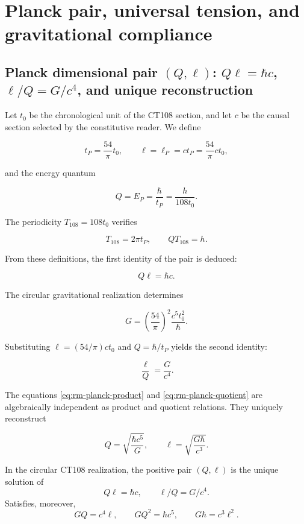\chapter{Planck pair, universal tension, and gravitational compliance}
\label{chap:pareja-planck-respuesta}

\section{Planck dimensional pair \((Q,\ell)\): \(Q\ell=\hbar c\), \(\ell/Q=G/c^4\), and unique reconstruction}

Let \(t_0\) be the chronological unit of the CT108 section, and let \(c\) be the
causal section selected by the constitutive reader. We define

\[
t_P=\frac{54}{\pi}t_0,
\qquad
\ell=\ell_P=ct_P=\frac{54}{\pi}ct_0,
\]

and the energy quantum

\[
Q=E_P=\frac{\hbar}{t_P}=\frac{h}{108t_0}.
\]

The periodicity \(T_{108}=108t_0\) verifies

\[
T_{108}=2\pi t_P,
\qquad
QT_{108}=h.
\]

From these definitions, the first identity of the pair is deduced:

\begin{equation}
\boxed{Q\ell=\hbar c.}
\label{eq:rm-planck-product}
\end{equation}

The circular gravitational realization determines

\[
G=\left(\frac{54}{\pi}\right)^2\frac{c^5t_0^2}{\hbar}.
\]

Substituting \(\ell=(54/\pi)ct_0\) and \(Q=\hbar/t_P\) yields the
second identity:

\begin{equation}
\boxed{\frac{\ell}{Q}=\frac{G}{c^4}.}
\label{eq:rm-planck-quotient}
\end{equation}

The equations \eqref{eq:rm-planck-product} and
\eqref{eq:rm-planck-quotient} are algebraically independent as
product and quotient relations. They uniquely reconstruct

\[
Q=\sqrt{\frac{\hbar c^5}{G}},
\qquad
\ell=\sqrt{\frac{G\hbar}{c^3}}.
\]

\begin{theorem}
\label{thm:rm-planck-pair}
In the circular CT108 realization, the positive pair \((Q,\ell)\) is the
unique solution of
\[
Q\ell=\hbar c,
\qquad
\ell/Q=G/c^4.
\]
Satisfies, moreover,
\[
GQ=c^4\ell,
\qquad
GQ^2=\hbar c^5,
\qquad
G\hbar=c^3\ell^2.
\]
\end{theorem}

